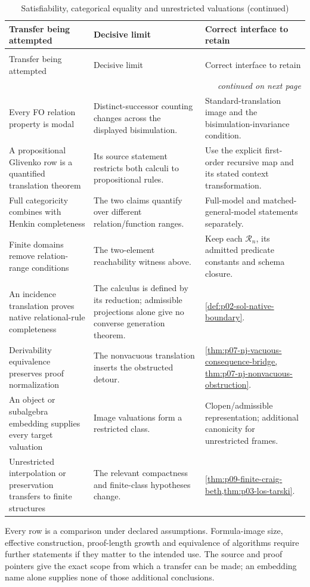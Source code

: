 \begin{longtable}{@{}p{}p{}p{}@{}}
\caption{Satisfiability, categorical equality and unrestricted valuations}\\
\toprule
Transfer being attempted & Decisive limit & Correct interface to retain \\
\midrule
\endfirsthead
\caption[]{Satisfiability, categorical equality and unrestricted valuations (continued)}\\
\toprule
Transfer being attempted & Decisive limit & Correct interface to retain \\
\midrule
\endhead
\midrule\multicolumn{3}{r}{\emph{continued on next page}}\\
\endfoot
\endlastfoot
Every FO relation property is modal & Distinct-successor counting changes
across the displayed bisimulation. & Standard-translation image and the
bisimulation-invariance condition. \\
A propositional Glivenko row is a quantified translation theorem & Its
source statement restricts both calculi to propositional rules. & Use the
explicit first-order recursive map and its stated context transformation. \\
Full categoricity combines with Henkin completeness & The two claims
quantify over different relation/function ranges. & Full-model and
matched-general-model statements separately. \\
Finite domains remove relation-range conditions & The two-element
reachability witness above. & Keep each \(\mathcal R_n\), its admitted
predicate constants and schema closure. \\
An incidence translation proves native relational-rule completeness & The
calculus is defined by its reduction; admissible projections alone give no
converse generation theorem. & \cref{def:p02-sol-native-boundary}. \\
Derivability equivalence preserves proof normalization & The nonvacuous
translation inserts the obstructed detour. &
\cref{thm:p07-nj-vacuous-consequence-bridge,
thm:p07-nj-nonvacuous-obstruction}. \\
An object or subalgebra embedding supplies every target valuation & Image
valuations form a restricted class. & Clopen/admissible representation;
additional canonicity for unrestricted frames. \\
Unrestricted interpolation or preservation transfers to finite structures &
The relevant compactness and finite-class hypotheses change. &
\cref{thm:p09-finite-craig-beth,thm:p03-los-tarski}. \\
\bottomrule
\end{longtable}

Every row is a comparison under declared assumptions. Formula-image size,
effective construction, proof-length growth and equivalence of algorithms
require further statements if they matter to the intended use. The source
and proof pointers give the exact scope from which a transfer can be made;
an embedding name alone supplies none of those additional conclusions.

